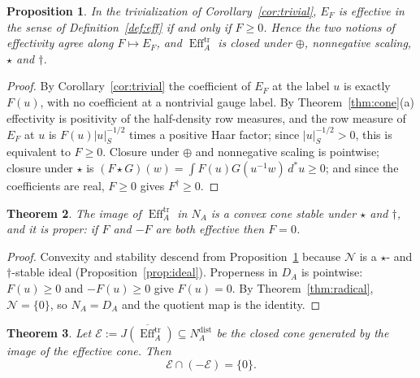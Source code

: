 \documentclass[11pt]{amsart}
\newtheorem{theorem}{Theorem}[section]
\newtheorem{proposition}[theorem]{Proposition}
\theoremstyle{definition}
\theoremstyle{remark}
\newcommand{\dstar}{\,d^{*}}
\newcommand{\Eff}{\operatorname{Eff}}
\newcommand{\DA}{D_A}
\newcommand{\Nrad}{\mathcal N}
\newcommand{\NAd}{N_A^{\mathrm{dist}}}
\begin{document}
\begin{proposition}\label{prop:effsmear}
In the trivialization of Corollary~\ref{cor:trivial}, $E_F$ is effective in the
sense of Definition~\ref{def:eff} if and only if $F\ge0$.  Hence the two
notions of effectivity agree along $F\mapsto E_F$, and
$\Eff_A^{\mathrm{tr}}$ is closed under $\oplus$, nonnegative scaling, $\star$
and $\dagger$.
\end{proposition}

\begin{proof}
By Corollary~\ref{cor:trivial} the coefficient of $E_F$ at the label $u$ is
exactly $F(u)$, with no coefficient at a nontrivial gauge label.  By
Theorem~\ref{thm:cone}(a) effectivity is positivity of the half-density row
measures, and the row measure of $E_F$ at $u$ is $F(u)|u|_S^{-1/2}$ times a
positive Haar factor; since $|u|_S^{-1/2}>0$, this is equivalent to $F\ge0$.
Closure under $\oplus$ and nonnegative scaling is pointwise; closure under
$\star$ is $(F\star G)(w)=\int F(u)G(u^{-1}w)\dstar u\ge0$; and since the
coefficients are real, $F\ge0$ gives $F^{\dagger}\ge0$.
\end{proof}

\begin{theorem}\label{thm:properness}
The image of $\Eff_A^{\mathrm{tr}}$ in $N_A$ is a convex cone stable under
$\star$ and $\dagger$, and it is \emph{proper}: if $F$ and $-F$ are both
effective then $F=0$.
\end{theorem}

\begin{proof}
Convexity and stability descend from Proposition~\ref{prop:effsmear} because
$\Nrad$ is a $\star$- and $\dagger$-stable ideal
(Proposition~\ref{prop:ideal}).  Properness in $\DA$ is pointwise: $F(u)\ge0$
and $-F(u)\ge0$ give $F(u)=0$.  By Theorem~\ref{thm:radical}, $\Nrad=\{0\}$, so
$N_A=\DA$ and the quotient map is the identity.
\end{proof}

\begin{theorem}\label{thm:coneproper}
Let $\mathcal E:=\overline{J(\Eff_A^{\mathrm{tr}})}\subseteq\NAd$ be the closed
cone generated by the image of the effective cone.  Then
\begin{equation}\label{eq:properdist}
\mathcal E\cap(-\mathcal E)=\{0\}.
\end{equation}
\end{theorem}
\end{document}
